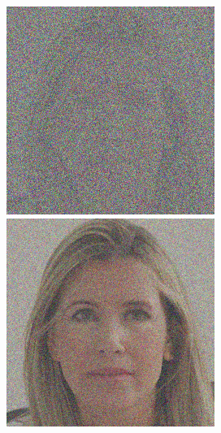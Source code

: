 \begin{figure}[H]
  \centering
  \begin{minipage}[b]{0.3\linewidth}
\includegraphics[width=\linewidth]{Picture/progress/box/x_0500.png}
  \end{minipage}
  \hspace{0.1cm} %
   \begin{minipage}[b]{0.3\linewidth}
    \includegraphics[width=\linewidth]{Picture/progress/box/x_0100.png}

\end{minipage}
\end{figure}
